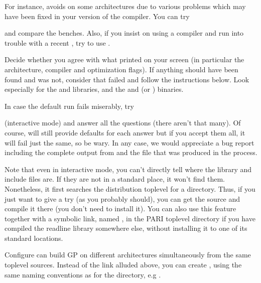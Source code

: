 \noindent For instance,  avoids  on some
architectures due to various problems which may have been fixed in your
version of the compiler. You can try


\noindent and compare the benches. Also, if you insist on using a 
compiler and run into trouble with a recent , try to use
.

 Decide whether you agree with what
 printed on your screen (in particular the architecture,
compiler and optimization flags). If anything should have been found and was
not, consider that  failed and follow the instructions below.
Look especially for the  and  libraries, and the
 and  (or ) binaries.

In case the default  run fails miserably, try


\noindent (interactive mode) and answer all the questions (there aren't that
many). Of course,  will still provide defaults for each answer
but if you accept them all, it will fail just the same, so be wary. In any
case, we would appreciate a bug report including the complete output from
 and the file  that was produced in
the process.

Note that even in interactive mode, you can't directly tell 
where the  library and include files are. If they are not in a
standard place, it won't find them. Nonetheless, it first searches the
distribution toplevel for a  directory. Thus, if you just want
to give  a try (as you probably should), you can get the source
and compile it there (you don't need to install it). You can also use this
feature together with a symbolic link, named , in the PARI
toplevel directory if you have compiled the readline library somewhere else,
without installing it to one of its standard locations. 

 Configure can build GP on different architectures
simultaneously from the same toplevel sources. Instead of the 
link alluded above, you can create ,
using the same naming conventions as for the  directory,
e.g .

